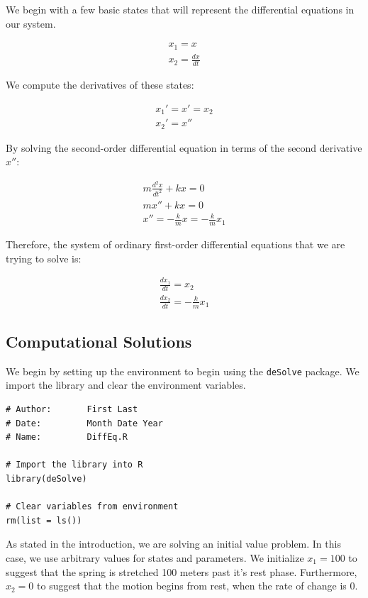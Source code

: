 We begin with a few basic states that will represent the differential equations in our system.

\begin{gather*}
    x_1 = x\\
    x_2 = \frac{dx}{dt}
\end{gather*}

We compute the derivatives of these states:

\begin{gather*}
    x_1' = x' = x_2\\
    x_2' = x''
\end{gather*}

By solving the second-order differential equation in terms of the second derivative $x''$:

\begin{gather*}
    m\frac{d^2 x}{dt^2}+kx=0\\
    mx''+kx=0\\
    x''=-\frac{k}{m}x=-\frac{k}{m}x_1
\end{gather*}

Therefore, the system of ordinary first-order differential equations that we are trying to solve is:

\begin{gather*}
    \frac{dx_1}{dt}=x_2\\
    \frac{dx_2}{dt}=-\frac{k}{m}x_1
\end{gather*}

\subsection{Computational Solutions}

We begin by setting up the environment to begin using the \texttt{deSolve} package. We import the library and clear the environment variables.

\begin{lstlisting}
# Author:       First Last
# Date:         Month Date Year
# Name:         DiffEq.R

# Import the library into R
library(deSolve)

# Clear variables from environment
rm(list = ls())
\end{lstlisting}

As stated in the introduction, we are solving an initial value problem.
In this case, we use arbitrary values for states and parameters.
We initialize $x_1=100$ to suggest that the spring is stretched 100 meters past it's rest phase.
Furthermore, $x_2=0$ to suggest that the motion begins from rest, when the rate of change is 0.

